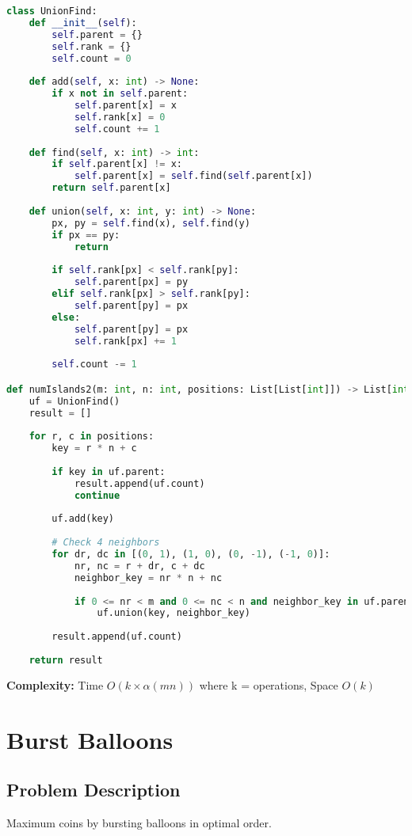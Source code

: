 \documentclass[10pt, a4paper]{article}
\begin{document}
\begin{lstlisting}[language=Python]
class UnionFind:
    def __init__(self):
        self.parent = {}
        self.rank = {}
        self.count = 0
    
    def add(self, x: int) -> None:
        if x not in self.parent:
            self.parent[x] = x
            self.rank[x] = 0
            self.count += 1
    
    def find(self, x: int) -> int:
        if self.parent[x] != x:
            self.parent[x] = self.find(self.parent[x])
        return self.parent[x]
    
    def union(self, x: int, y: int) -> None:
        px, py = self.find(x), self.find(y)
        if px == py:
            return
        
        if self.rank[px] < self.rank[py]:
            self.parent[px] = py
        elif self.rank[px] > self.rank[py]:
            self.parent[py] = px
        else:
            self.parent[py] = px
            self.rank[px] += 1
        
        self.count -= 1

def numIslands2(m: int, n: int, positions: List[List[int]]) -> List[int]:
    uf = UnionFind()
    result = []
    
    for r, c in positions:
        key = r * n + c
        
        if key in uf.parent:
            result.append(uf.count)
            continue
        
        uf.add(key)
        
        # Check 4 neighbors
        for dr, dc in [(0, 1), (1, 0), (0, -1), (-1, 0)]:
            nr, nc = r + dr, c + dc
            neighbor_key = nr * n + nc
            
            if 0 <= nr < m and 0 <= nc < n and neighbor_key in uf.parent:
                uf.union(key, neighbor_key)
        
        result.append(uf.count)
    
    return result
\end{lstlisting}
\textbf{Complexity:} Time $O(k \times \alpha(mn))$ where k = operations, Space $O(k)$

\section{Burst Balloons}
\subsection*{Problem Description}
Maximum coins by bursting balloons in optimal order.
\end{document}
